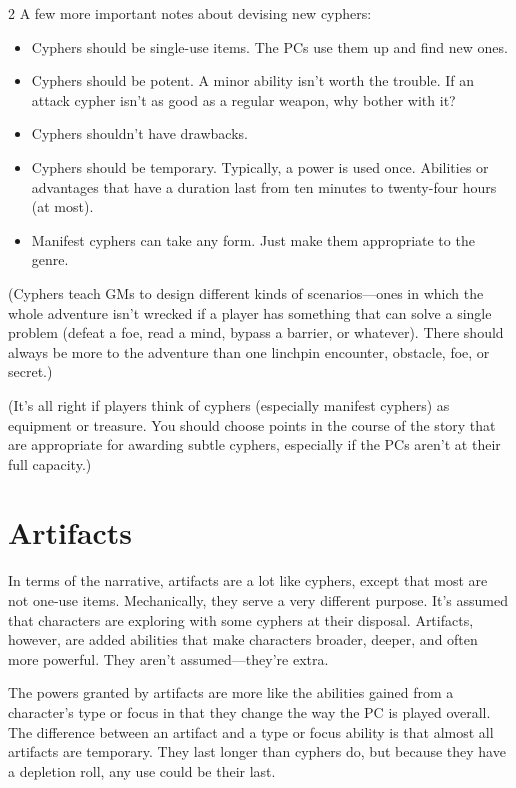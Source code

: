 \begin{multicols}{2}
A few more important notes about devising new cyphers:

\begin{itemize}
\item Cyphers should be single-use items. The PCs use them up and find new ones.
\item Cyphers should be potent. A minor ability isn’t worth the trouble. If an attack cypher isn’t as good as a regular weapon, why bother with it?
\item Cyphers shouldn’t have drawbacks.
\item Cyphers should be temporary. Typically, a power is used once. Abilities or advantages that have a duration last from ten minutes to twenty-four hours (at most).
\item Manifest cyphers can take any form. Just make them appropriate to the genre.
\end{itemize}

(Cyphers teach GMs to design different kinds of scenarios—ones in which the whole adventure isn’t wrecked if a player has something that can solve a single problem (defeat a foe, read a mind, bypass a barrier, or whatever). There should always be more to the adventure than one linchpin encounter, obstacle, foe, or secret.)

(It’s all right if players think of cyphers (especially manifest cyphers) as equipment or treasure. You should choose points in the course of the story that are appropriate for awarding subtle cyphers, especially if the PCs aren’t at their full capacity.)

\chapter{Artifacts}

In terms of the narrative, artifacts are a lot like cyphers, except that most are not one-use items. Mechanically, they serve a very different purpose. It’s assumed that characters are exploring with some cyphers at their disposal. Artifacts, however, are added abilities that make characters broader, deeper, and often more powerful. They aren’t assumed—they’re extra.

The powers granted by artifacts are more like the abilities gained from a character’s type or focus in that they change the way the PC is played overall. The difference between an artifact and a type or focus ability is that almost all artifacts are temporary. They last longer than cyphers do, but because they have a depletion roll, any use could be their last.


\end{multicols}
